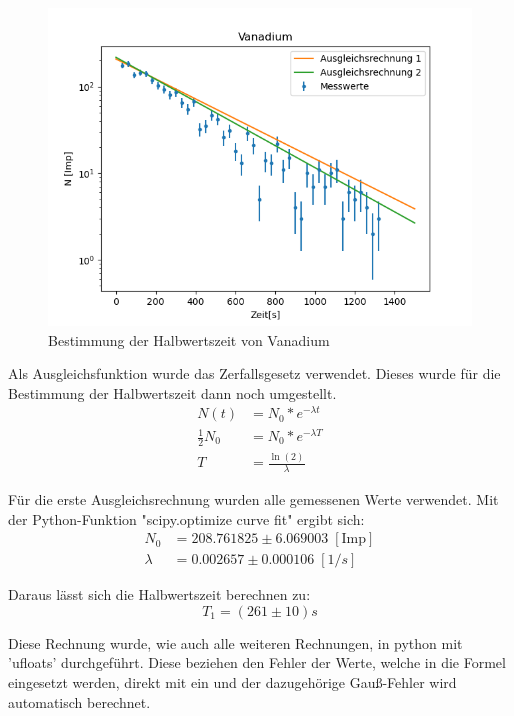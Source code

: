 \begin{figure}[H]
    \centering
    \includegraphics{"22.png"}
    \caption{Bestimmung der Halbwertszeit von Vanadium}
    \label{Fig:Halbwertszeit}
\end{figure}

\noindent Als Ausgleichsfunktion wurde das Zerfallsgesetz verwendet.
Dieses wurde für die Bestimmung der Halbwertszeit dann noch umgestellt.
\begin{align}
    N(t) &= N_0 * e^{-\lambda t} \nonumber \\
    \frac{1}{2} N_0 &= N_0 * e^{-\lambda T} \nonumber \\
    T &= \frac{\ln(2)}{\lambda} \nonumber
\end{align}

\noindent Für die erste Ausgleichsrechnung wurden alle gemessenen Werte verwendet.
Mit der Python-Funktion "scipy.optimize curve fit" ergibt sich:
\begin{align}
    N_0 &=  208.761825 \pm 6.069003 \; [\text{Imp}] \nonumber \\
    \lambda &= 0.002657 \pm 0.000106 \; [1/s] \nonumber
\end{align}

\noindent Daraus lässt sich die Halbwertszeit berechnen zu:
\begin{displaymath}
    T_1 = (261 \pm 10) s 
\end{displaymath}

Diese Rechnung wurde, wie auch alle weiteren Rechnungen, in python mit 'ufloats' durchgeführt. Diese beziehen den Fehler der Werte, welche in die Formel eingesetzt werden, direkt mit ein und der dazugehörige Gauß-Fehler wird automatisch berechnet. 

